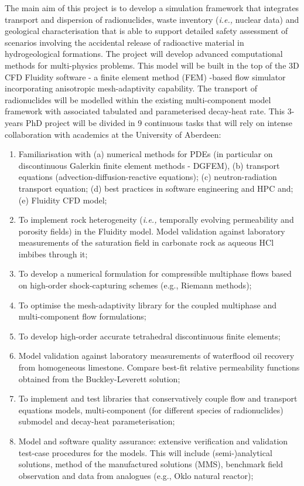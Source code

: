 \documentclass[12pts,a4paper,amsmath,amssymb,floatfix]{article}%
\newcommand{\ie}{{\it i.e., }}
\begin{document}
\begin{enumerate}[label=\bfseries Project: \arabic*:]
The main aim of this project is to develop a simulation framework that integrates transport and dispersion of radionuclides, waste inventory (\ie nuclear data) and geological characterisation that is able to support detailed safety assessment of scenarios involving the accidental release of radioactive material in hydrogeological formations. The project will develop advanced computational methods for multi-physics problems. This model will be built in the top of the 3D CFD Fluidity software - a finite element method (FEM) -based flow simulator incorporating anisotropic mesh-adaptivity capability. The transport of radionuclides will be modelled within the existing multi-component model framework with associated tabulated and parameterised decay-heat rate. This 3-years PhD project will be divided in 9 continuous tasks that will rely on intense collaboration with academics at the University of Aberdeen:
\begin{enumerate}
   \item Familiarisation with (a) numerical methods for PDEs (in particular on discontinuous Galerkin finite element methods - DGFEM), (b) transport equations (advection-diffusion-reactive equations); (c) neutron-radiation transport equation; (d) best practices in software engineering and HPC and; (e) Fluidity CFD model;
   \item To implement rock heterogeneity (\ie temporally evolving permeability and porosity fields) in the Fluidity model. Model validation against laboratory measurements of the saturation field in carbonate rock as aqueous HCl imbibes through it;
   \item To develop a numerical formulation for compressible multiphase flows based on high-order shock-capturing schemes (e.g., Riemann methods);
   \item To optimise the mesh-adaptivity library for the coupled multiphase and multi-component flow formulations;
   \item To develop high-order accurate tetrahedral discontinuous finite elements;
   \item Model validation against laboratory measurements of waterflood oil recovery from homogeneous limestone. Compare best-fit relative permeability functions obtained from the Buckley-Leverett solution;
   \item To implement and test libraries that conservatively couple flow and transport equations models, multi-component (for different species of radionuclides) submodel and decay-heat parameterisation;
   \item Model and software quality assurance: extensive verification and validation test-case procedures for the models. This will include (semi-)analytical solutions, method of the manufactured solutions (MMS), benchmark field observation and data from analogues (e.g., Oklo natural reactor);
\end{enumerate}



\end{enumerate}
\end{document}
